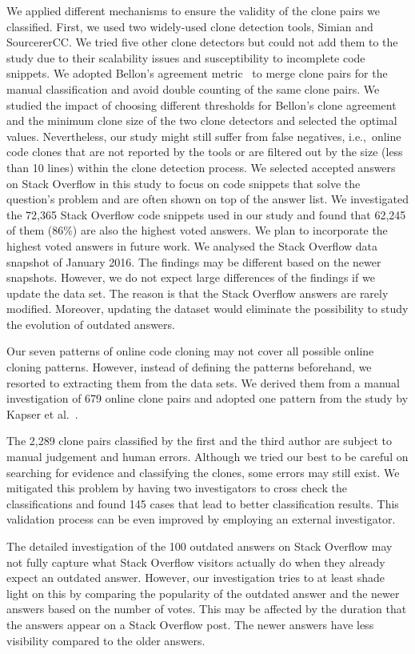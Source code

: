 \documentclass[10pt,journal,compsoc]{IEEEtran}
\begin{document}
We applied different mechanisms to ensure the validity of the clone pairs we
classified.  First, we used two widely-used clone detection tools, Simian and
SourcererCC.  We tried five other clone detectors but could not add them to the
study due to their scalability issues and susceptibility to incomplete code
snippets. We adopted Bellon's agreement metric~\cite{Bellon2007} to merge clone
pairs for the manual classification and avoid double counting of the same clone
pairs. We studied the impact of choosing different thresholds for Bellon's clone agreement and the minimum clone
size of the two clone detectors and selected the optimal values.
Nevertheless, our study might still suffer from false negatives,
i.e.,~online code clones that are not reported by the tools or are filtered out
by the size (less than 10 lines) within the clone detection process. We selected
accepted answers on Stack Overflow in this study to focus on code snippets that
solve the question's problem and are often shown on top of the answer list.
We investigated the 72,365 Stack Overflow code snippets used in our study and
found that 62,245 of them (86\%) are also the highest voted answers.
We plan to incorporate the highest voted answers in future work.
We analysed the Stack Overflow data snapshot of January 2016. 
The findings may be different based on the newer snapshots. 
However, we do not expect large differences of the findings 
if we update the data set. The reason is that the Stack Overflow answers 
are rarely modified. Moreover, updating the dataset would eliminate the 
possibility to study the evolution of outdated answers. 

Our seven patterns of online code cloning may not cover all possible online
cloning patterns. However, instead of defining the patterns beforehand, we
resorted to extracting them from the data sets. We derived them from a manual
investigation of 679 online clone pairs and adopted one pattern from the study
by Kapser et al.~\cite{Kapser2003}.

The 2,289 clone pairs classified by the first and the third author are subject
to manual judgement and human errors.  Although we tried our best to be careful
on searching for evidence and classifying the clones, some errors may still
exist. We mitigated this problem by having two investigators to cross check the
classifications and found 145 cases that lead to better classification results.
This validation process can be even improved by employing an external
investigator. 

The detailed investigation of the 100 outdated answers on Stack Overflow may not
fully capture what Stack Overflow visitors actually do when they already expect
an outdated answer. However, our investigation tries to at least shade light on
this by comparing the popularity of the outdated answer and the newer answers
based on the number of votes. This may be affected by the duration that the
answers appear on a Stack Overflow post. The newer answers have less visibility
compared to the older answers.
\end{document}
